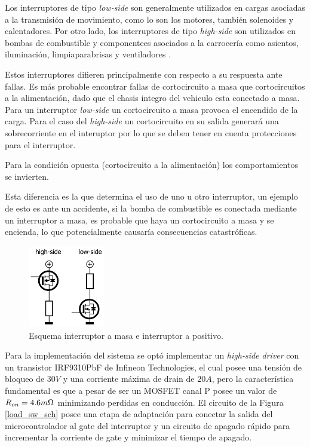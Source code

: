 \documentclass[10pt, a4paper]{report}
\begin{document}
Los interruptores de tipo \emph{low-side} son generalmente utilizados en cargas
asociadas a la transmisión de movimiento, como lo son los motores, también
solenoides y calentadores. Por otro lado, los interruptores de tipo
\emph{high-side} son utilizados en bombas de combustible y componentees
asociados a la carrocería como asientos, iluminación, limpiaparabrisas y
ventiladores \cite{DigKey2016}.

Estos interruptores difieren principalmente con respecto a su respuesta ante
fallas. Es más probable encontrar fallas de cortocircuito a masa que
cortocircuitos a la alimentación, dado que el chasis integro del vehiculo esta
conectado a masa. Para un interruptor \emph{low-side} un cortocircuito a masa
provoca el encendido de la carga. Para el caso del \emph{high-side} un
cortocircuito en su salida generará una sobrecorriente en el interuptor por lo
que se deben tener en cuenta protecciones para el interruptor.

Para la condición opuesta (cortocircuito a la alimentación) los comportamientos
se invierten.

Esta diferencia es la que determina el uso de uno u otro interruptor, un ejemplo
de esto es ante un accidente, si la bomba de combustible es conectada mediante
un interruptor a masa, es probable que haya un cortocircuito a masa y se
encienda, lo que potencialmente causaría consecuencias catastróficas.

\begin{figure}[h!]
	\begin{center}
		\includegraphics[width=0.30\textwidth]{low_high_driver_sch.png}
		\caption{Esquema interruptor a masa e interruptor a positivo.}
		\label{low_high_driver_sch}
	\end{center}
\end{figure}
\FloatBarrier

Para la implementación del sistema se optó implementar un \emph{high-side
driver} con un transistor IRF9310PbF de Infineon Technologies, el cual posee una
tensión de bloqueo de $30V$ y una corriente máxima de drain de $20A$, pero la
característica fundamental es que a pesar de ser un MOSFET canal P posee un
valor de $R_{on}=4.6 m\ohm$ minimizando perdidas en conducción. El circuito de
la Figura \ref{load_sw_sch} posee una etapa de adaptación para conectar la
salida del microcontrolador al gate del interruptor y un circuito de apagado
rápido para incrementar la corriente de gate y minimizar el tiempo de apagado.
\end{document}
